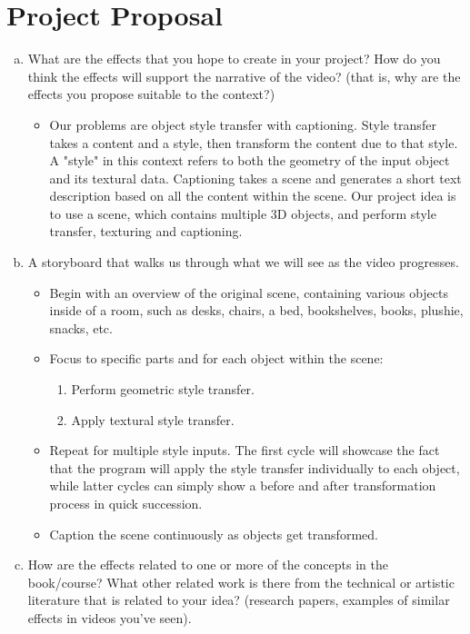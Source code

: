 \documentclass[]{article}
\begin{document}
\section{Project Proposal}
\begin{enumerate}[(a)]
    \item What are the effects that you hope to create in your project? How do you think the effects will support the narrative of the video? (that is, why are the effects you propose suitable to the context?)
    \begin{itemize}
        \item Our problems are object style transfer with captioning. Style transfer takes a content and a style, then transform the content due to that style. A "style" in this context refers to both the geometry of the input object and its textural data. Captioning takes a scene and generates a short text description based on all the content within the scene. Our project idea is to use a scene, which contains multiple 3D objects, and perform style transfer, texturing and captioning.
    \end{itemize}
    \item A storyboard that walks us through what we will see as the video progresses.
    \begin{itemize}
        \item Begin with an overview of the original scene, containing various objects inside of a room, such as desks, chairs, a bed, bookshelves, books, plushie, snacks, etc.
        \item Focus to specific parts and for each object within the scene:
        \begin{enumerate}
            \item Perform geometric style transfer.
            \item Apply textural style transfer.
        \end{enumerate}
        \item Repeat for multiple style inputs. The first cycle will showcase the fact that the program will apply the style transfer individually to each object, while latter cycles can simply show a before and after transformation process in quick succession.
        \item Caption the scene continuously as objects get transformed.
    \end{itemize}
    \item How are the effects related to one or more of the concepts in the book/course? What other related work is there from the technical or artistic literature that is related to your idea? (research papers, examples of similar effects in videos you’ve seen).

\end{enumerate}
\end{document}
